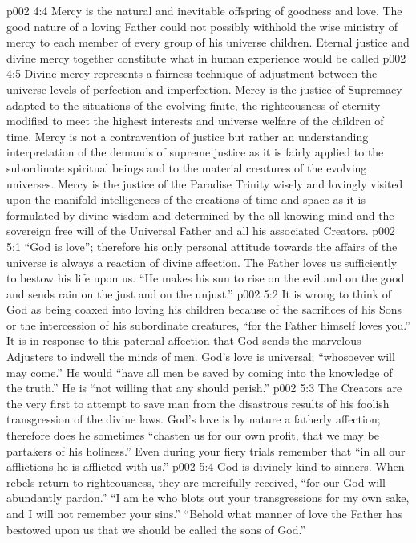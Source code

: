 \vs p002 4:4 Mercy is the natural and inevitable offspring of goodness and love. The good nature of a loving Father could not possibly withhold the wise ministry of mercy to each member of every group of his universe children. Eternal justice and divine mercy together constitute what in human experience would be called 
\vs p002 4:5 Divine mercy represents a fairness technique of adjustment between the universe levels of perfection and imperfection. Mercy is the justice of Supremacy adapted to the situations of the evolving finite, the righteousness of eternity modified to meet the highest interests and universe welfare of the children of time. Mercy is not a contravention of justice but rather an understanding interpretation of the demands of supreme justice as it is fairly applied to the subordinate spiritual beings and to the material creatures of the evolving universes. Mercy is the justice of the Paradise Trinity wisely and lovingly visited upon the manifold intelligences of the creations of time and space as it is formulated by divine wisdom and determined by the all\hyp{}knowing mind and the sovereign free will of the Universal Father and all his associated Creators.\plusone
{}
\vs p002 5:1 “God is love”; therefore his only personal attitude towards the affairs of the universe is always a reaction of divine affection. The Father loves us sufficiently to bestow his life upon us. “He makes his sun to rise on the evil and on the good and sends rain on the just and on the unjust.”
\pc \vs p002 5:2 It is wrong to think of God as being coaxed into loving his children because of the sacrifices of his Sons or the intercession of his subordinate creatures, “for the Father himself loves you.” It is in response to this paternal affection that God sends the marvelous Adjusters to indwell the minds of men. God’s love is universal; “whosoever will may come.” He would “have all men be saved by coming into the knowledge of the truth.” He is “not willing that any should perish.”
\vs p002 5:3 The Creators are the very first to attempt to save man from the disastrous results of his foolish transgression of the divine laws. God’s love is by nature a fatherly affection; therefore does he sometimes “chasten us for our own profit, that we may be partakers of his holiness.” Even during your fiery trials remember that “in all our afflictions he is afflicted with us.”
\vs p002 5:4 God is divinely kind to sinners. When rebels return to righteousness, they are mercifully received, “for our God will abundantly pardon.” “I am he who blots out your transgressions for my own sake, and I will not remember your sins.” “Behold what manner of love the Father has bestowed upon us that we should be called the sons of God.”
